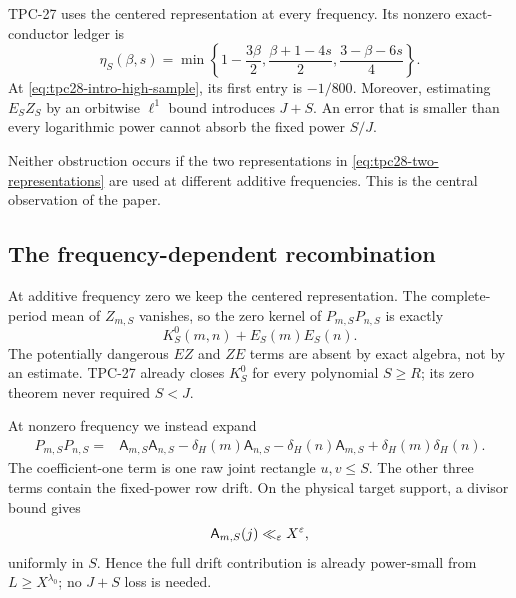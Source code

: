 TPC-27 uses the centered representation at every frequency.  Its
nonzero exact-conductor ledger is
\begin{equation}
 \eta_S(\beta,s)=
 \min\left\{
 1-\frac{3\beta}{2},
 \frac{\beta+1-4s}{2},
 \frac{3-\beta-6s}{4}
 \right\}.
 \label{eq:tpc28-old-centered-ledger}
\end{equation}
At \eqref{eq:tpc28-intro-high-sample}, its first entry is
$-1/800$.  Moreover, estimating $E_SZ_S$ by an orbitwise
\(\ell^1\) bound introduces $J+S$.  An error that is smaller than
every logarithmic power cannot absorb the fixed power $S/J$.

Neither obstruction occurs if the two representations in
\eqref{eq:tpc28-two-representations} are used at different additive
frequencies.  This is the central observation of the paper.

\subsection{The frequency-dependent recombination}

At additive frequency zero we keep the centered representation.  The
complete-period mean of $Z_{m,S}$ vanishes, so the zero kernel of
$P_{m,S}P_{n,S}$ is exactly
\begin{equation}
 K_S^0(m,n)+E_S(m)E_S(n).
 \label{eq:tpc28-intro-zero-result}
\end{equation}
The potentially dangerous $EZ$ and $ZE$ terms are absent by exact
algebra, not by an estimate.  TPC-27 already closes $K_S^0$ for every
polynomial $S\ge R$; its zero theorem never required $S<J$.

At nonzero frequency we instead expand
\begin{equation}
 \begin{aligned}
 P_{m,S}P_{n,S}
 ={}&\mathsf A_{m,S}\mathsf A_{n,S}
 -\delta_H(m)\mathsf A_{n,S}
 -\delta_H(n)\mathsf A_{m,S}
 +\delta_H(m)\delta_H(n).
 \end{aligned}
 \label{eq:tpc28-intro-raw-expansion}
\end{equation}
The coefficient-one term is one raw joint rectangle $u,v\le S$.
The other three terms contain the fixed-power row drift.  On the
physical target support, a divisor bound gives
\begin{equation}
 \mathsf A_{m,S}(j)\ll_\varepsilon X^\varepsilon,
 \label{eq:tpc28-intro-divisor-bound}
\end{equation}
uniformly in $S$.  Hence the full drift contribution is already
power-small from $L\ge X^{\lambda_0}$; no $J+S$ loss is needed.


